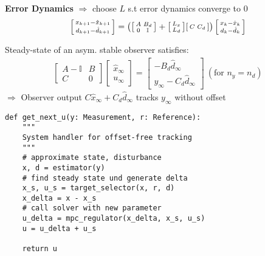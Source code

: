 \textbf{Error Dynamics} $\Rightarrow$
choose $L$ s.t error dynamics converge to $0$
\begin{align*}
	\begin{bsmallmatrix}
		x_{k+1} - \hat{x}_{k+1} \\
		d_{k+1} - \hat{d}_{k+1}
	\end{bsmallmatrix}
	= \left(
	\begin{bsmallmatrix}
		A & B_d        \\
		0 & \mathbb{I}
	\end{bsmallmatrix}
	+
	\begin{bsmallmatrix}
		L_x \\
		L_d
	\end{bsmallmatrix}
	\begin{bsmallmatrix}
		C & C_d
	\end{bsmallmatrix}
	\right)
	\begin{bsmallmatrix}
		x_{k} - \hat{x}_{k} \\
		d_{k} - \hat{d}_{k}
	\end{bsmallmatrix}
\end{align*}

\begin{lemma}
	Steady-state of an asym. stable
	observer satisfies:
	\begin{align*}
		\begin{bmatrix}
			A-\mathbb{I} & B \\
			C            & 0
		\end{bmatrix}
		\begin{bmatrix}
			\hat{x}_\infty \\
			u_\infty
		\end{bmatrix}
		=
		\begin{bmatrix}
			-B_d \hat{d}_\infty \\
			y_\infty - C_d \hat{d}_\infty
		\end{bmatrix}
		\ (\text{for }n_y = n_d)
	\end{align*}
	$\Rightarrow$ Observer output $C\hat{x}_\infty + C_d \hat{d}_\infty$ tracks $y_\infty$ without offset
\end{lemma}

\begin{adjustbox}{rndcorners=0.5mm}
	\begin{lstlisting}[style=sst]
def get_next_u(y: Measurement, r: Reference):
    """
    System handler for offset-free tracking
    """
    # approximate state, disturbance
    x, d = estimator(y)
    # find steady state und generate delta
    x_s, u_s = target_selector(x, r, d)
    x_delta = x - x_s
    # call solver with new parameter
    u_delta = mpc_regulator(x_delta, x_s, u_s)
    u = u_delta + u_s

    return u
\end{lstlisting}
\end{adjustbox}

